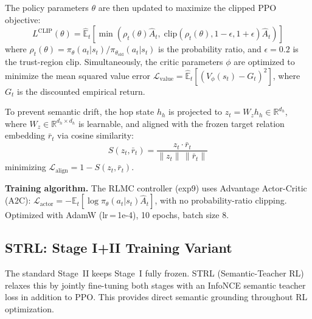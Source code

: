 \documentclass[10pt,conference]{IEEEtran}
\begin{document}
The policy parameters $\theta$ are then updated to maximize the clipped PPO objective:
\begin{equation}
L^{\text{CLIP}}(\theta) = \hat{\mathbb{E}}_t\!\left[\min\!\left(\rho_t(\theta)\hat{A}_t,\; \text{clip}(\rho_t(\theta), 1{-}\epsilon, 1{+}\epsilon)\hat{A}_t\right)\right]
\end{equation}
where $\rho_t(\theta) = \pi_\theta(a_t|s_t) / \pi_{\theta_{\text{old}}}(a_t|s_t)$ is the probability ratio, and $\epsilon=0.2$ is the trust-region clip. Simultaneously, the critic parameters $\phi$ are optimized to minimize the mean squared value error $\mathcal{L}_{\text{value}} = \hat{\mathbb{E}}_t [ (V_\phi(s_t) - G_t)^2 ]$, where $G_t$ is the discounted empirical return.

To prevent semantic drift, the hop state $h_h$ is projected to $z_t = W_z h_h \in \mathbb{R}^{d_h}$, where $W_z \in \mathbb{R}^{d_h \times d_h}$ is learnable, and aligned with the frozen target relation embedding $\bar{r}_t$ via cosine similarity:
\begin{equation}
S(z_t, \bar{r}_t) = \frac{z_t \cdot \bar{r}_t}{\|z_t\|\,\|\bar{r}_t\|}
\end{equation}
minimizing $\mathcal{L}_{\text{align}} = 1 - S(z_t, \bar{r}_t)$.

\textbf{Training algorithm.} The RLMC controller (exp9) uses Advantage Actor-Critic (A2C): $\mathcal{L}_{\text{actor}} = -\mathbb{E}_t[\log \pi_\theta(a_t|s_t) \hat{A}_t]$, with no probability-ratio clipping. Optimized with AdamW (lr\,=\,1e-4), 10 epochs, batch size 8.

\subsection{STRL: Stage I+II Training Variant}

The standard Stage~II keeps Stage~I fully frozen. STRL (Semantic-Teacher RL) relaxes this by jointly fine-tuning both stages with an InfoNCE semantic teacher loss in addition to PPO. This provides direct semantic grounding throughout RL optimization.
\end{document}
